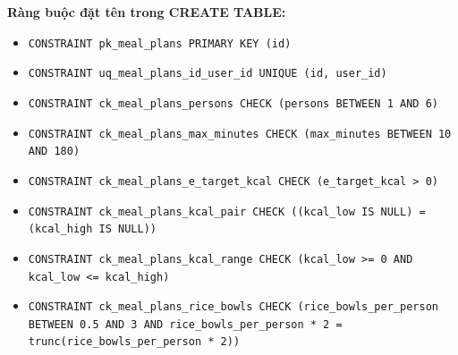 \textbf{Ràng buộc đặt tên trong CREATE TABLE:}

\begin{itemize}
\item \raggedright {\small\texttt{CONSTRAINT pk\_\allowbreak{}\allowbreak{}meal\_\allowbreak{}\allowbreak{}plans PRIMARY KEY (id)}}
\item \raggedright {\small\texttt{CONSTRAINT uq\_\allowbreak{}\allowbreak{}meal\_\allowbreak{}\allowbreak{}plans\_\allowbreak{}\allowbreak{}id\_\allowbreak{}\allowbreak{}user\_\allowbreak{}\allowbreak{}id UNIQUE (id, user\_\allowbreak{}\allowbreak{}id)}}
\item \raggedright {\small\texttt{CONSTRAINT ck\_\allowbreak{}\allowbreak{}meal\_\allowbreak{}\allowbreak{}plans\_\allowbreak{}\allowbreak{}persons CHECK (persons BETWEEN 1 AND 6)}}
\item \raggedright {\small\texttt{CONSTRAINT ck\_\allowbreak{}\allowbreak{}meal\_\allowbreak{}\allowbreak{}plans\_\allowbreak{}\allowbreak{}max\_\allowbreak{}\allowbreak{}minutes CHECK (max\_\allowbreak{}\allowbreak{}minutes BETWEEN 10 AND 180)}}
\item \raggedright {\small\texttt{CONSTRAINT ck\_\allowbreak{}\allowbreak{}meal\_\allowbreak{}\allowbreak{}plans\_\allowbreak{}\allowbreak{}e\_\allowbreak{}\allowbreak{}target\_\allowbreak{}\allowbreak{}kcal CHECK (e\_\allowbreak{}\allowbreak{}target\_\allowbreak{}\allowbreak{}kcal > 0)}}
\item \raggedright {\small\texttt{CONSTRAINT ck\_\allowbreak{}\allowbreak{}meal\_\allowbreak{}\allowbreak{}plans\_\allowbreak{}\allowbreak{}kcal\_\allowbreak{}\allowbreak{}pair CHECK ((kcal\_\allowbreak{}\allowbreak{}low IS NULL) = (kcal\_\allowbreak{}\allowbreak{}high IS NULL))}}
\item \raggedright {\small\texttt{CONSTRAINT ck\_\allowbreak{}\allowbreak{}meal\_\allowbreak{}\allowbreak{}plans\_\allowbreak{}\allowbreak{}kcal\_\allowbreak{}\allowbreak{}range CHECK (kcal\_\allowbreak{}\allowbreak{}low >= 0 AND kcal\_\allowbreak{}\allowbreak{}low <= kcal\_\allowbreak{}\allowbreak{}high)}}
\item \raggedright {\small\texttt{CONSTRAINT ck\_\allowbreak{}\allowbreak{}meal\_\allowbreak{}\allowbreak{}plans\_\allowbreak{}\allowbreak{}rice\_\allowbreak{}\allowbreak{}bowls CHECK (rice\_\allowbreak{}\allowbreak{}bowls\_\allowbreak{}\allowbreak{}per\_\allowbreak{}\allowbreak{}person BETWEEN 0.\allowbreak{}5 AND 3 AND rice\_\allowbreak{}\allowbreak{}bowls\_\allowbreak{}\allowbreak{}per\_\allowbreak{}\allowbreak{}person * 2 = trunc(rice\_\allowbreak{}\allowbreak{}bowls\_\allowbreak{}\allowbreak{}per\_\allowbreak{}\allowbreak{}person * 2))}}

\end{itemize}
